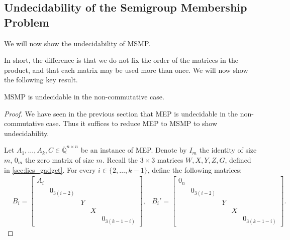 \documentclass[format=acmsmall, review=false, screen=true]{acmart}
\newcommand{\Rationals}{\mathbb{Q}}
\newcommand{\Algebraics}{\overline{\Rationals}}
\begin{document}
\subsection{Undecidability of the Semigroup Membership Problem}

We will now show the undecidability of MSMP\@. 

In short, the difference is that we do not fix the order of the matrices in the product, and that each matrix may be used more than once. We will now show the following key result.

\begin{theorem}
  MSMP is undecidable in the non-commutative case.
\end{theorem}

\begin{proof}
We have seen in the previous section that MEP is undecidable in the non-commutative
case. Thus it suffices to reduce MEP to MSMP to show undecidability.

Let $A_1,\ldots,A_k,C\in\Algebraics^{n\times n}$ be an instance of MEP\@. Denote by $I_m$ the identity of size $m$,
$0_m$ the zero matrix of size $m$. Recall the $3 \times 3$ matrices $W,X,Y,Z,G$, defined in \cref{sec:lics_gadget}.
For every $i\in\lbrace 2,\ldots,k-1\rbrace$, define the following matrices:
\begin{align*}
&B_{i}=\begin{bmatrix}A_{i}&&&&\\&0_{3(i-2)}&&&\\&&Y&&\\&&&X&\\&&&&0_{3(k-1-i)}\end{bmatrix},
&B_{i}'=\begin{bmatrix}0_n&&&&\\&0_{3(i-2)}&&&\\&&Y&&\\&&&X&\\&&&&0_{3(k-1-i)}\end{bmatrix}.
\end{align*}


\end{proof}
\end{document}
